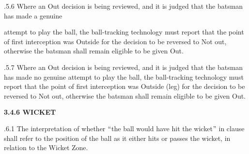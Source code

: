 \documentclass[12pt]{article}
\begin{document}
\vspace{\baselineskip}
\begin{adjustwidth}{0.49in}{0.0in}
{\fontsize{9pt}{10.8pt}.5.6 \tabto{1.17in} Where an Out decision is being reviewed, and it is judged that the batsman has made a genuine\par}\par

\end{adjustwidth}


\vspace{\baselineskip}
\begin{adjustwidth}{1.18in}{0.12in}
{\fontsize{9pt}{10.8pt}\selectfont attempt to play the ball, the ball-tracking technology must report that the point of first interception was Outside for the decision to be reversed to Not out, otherwise the batsman shall remain eligible to be given Out.\par}\par

\end{adjustwidth}


\vspace{\baselineskip}
\begin{adjustwidth}{1.18in}{0.12in}
{\fontsize{9pt}{10.8pt}.5.7 \tabto{1.17in} Where an Out decision is being reviewed, and it is judged that the batsman has made no genuine attempt to play the ball, the ball-tracking technology must report that the point of first interception was Outside (leg) for the decision to be reversed to Not out, otherwise the batsman shall remain eligible to be given Out.\par}\par

\end{adjustwidth}


\vspace{\baselineskip}
{\fontsize{9pt}{10.8pt}\selectfont \textbf{3.4.6 \tabto{0.49in} WICKET}\par}\par


\vspace{\baselineskip}
\begin{adjustwidth}{1.18in}{0.22in}
{\fontsize{9pt}{10.8pt}.6.1 \tabto{1.17in} The interpretation of whether $``$the ball would have hit the wicket$"$  in clause shall refer to the position of the ball as it either hits or passes the wicket, in relation to the Wicket Zone.\par}\par

\end{adjustwidth}
\end{document}

